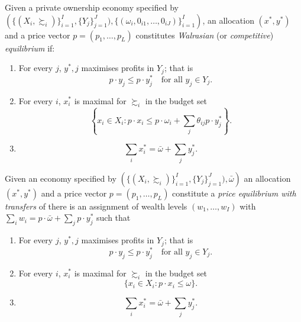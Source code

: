 \begin{defn}
    Given a private ownership economy specified by $\left(\{(X_i, \succsim_i)\}_{i = 1}^I, \{Y_j\}_{j = 1}^J), \{(\omega_i, 0_{i1}, \dots, 0_{iJ})\}_{i = 1}^I\right)$, an allocation $(x^*, y^*)$ and a price vector $p = (p_1, \dots, p_L)$ constitutes \emph{Walrasian} (or \emph{competitive}) \emph{equilibrium} if:
    \begin{enumerate}
        \item 
        For every $j$, $y^*, j$ maximises profits in $Y_j$; that is
        \begin{equation*}
            p \cdot y_j \leq p \cdot y^*_j \quad \text{for all } y_j \in Y_j.
        \end{equation*}
        
        \item 
        For every $i$, $x^*_i$ is maximal for $\succsim_i$ in the budget set
        \begin{equation*}
            \left\{x_i \in X_i : p \cdot x_i \leq p \cdot \omega_i + \sum_j \theta_{ij} p \cdot y^*_j \right\}.
        \end{equation*}

        \item 
        \begin{equation*}
            \sum_i x^*_i = \bar{\omega} + \sum_j y^*_j.
        \end{equation*}
    \end{enumerate}
\end{defn}

\begin{defn}
    Given an economy specified by $\left(\{(X_i, \succsim_i)\}_{i = 1}^I, \{Y_j\}_{j = 1}^J), \bar{\omega}\right)$ an allocation $(x^*, y^*)$ and a price vector $p = (p_1, \dots, p_L)$ constitute a \emph{price equilibrium with transfers} of there is an assignment of wealth levels $(w_1, \dots, w_I)$ with $\sum_i w_i = p \cdot \bar{\omega} + \sum_j p \cdot y^*_j$ such that
    \begin{enumerate}
        \item 
        For every $j$, $y^*, j$ maximises profits in $Y_j$; that is
        \begin{equation*}
            p \cdot y_j \leq p \cdot y^*_j \quad \text{for all } y_j \in Y_j.
        \end{equation*}
        
        \item 
        For every $i$, $x^*_i$ is maximal for $\succsim_i$ in the budget set
        \begin{equation*}
            \{x_i \in X_i : p \cdot x_i \leq \omega\}.
        \end{equation*}

        \item 
        \begin{equation*}
            \sum_i x^*_i = \bar{\omega} + \sum_j y^*_j.
        \end{equation*}
    \end{enumerate}
\end{defn}


